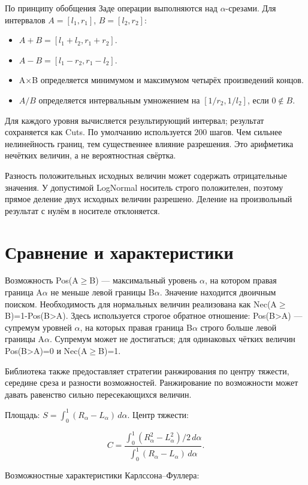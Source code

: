 \documentclass[fontsize=14pt,a4paper]{scrartcl}
\begin{document}
По принципу обобщения Заде операции выполняются над \(\alpha\)-срезами. Для интервалов $A=[l_1,r_1]$, $B=[l_2,r_2]$:

\begin{itemize}
\item $A+B=[l_1+l_2,r_1+r_2]$.
\item $A-B=[l_1-r_2,r_1-l_2]$.
\item A\(\times\)B определяется минимумом и максимумом четырёх произведений концов.
\item $A/B$ определяется интервальным умножением на $[1/r_2,1/l_2]$, если $0\notin B$.
\end{itemize}

Для каждого уровня вычисляется результирующий интервал; результат сохраняется как Cuts. По умолчанию используется 200 шагов. Чем сильнее нелинейность границ, тем существеннее влияние разрешения. Это арифметика нечётких величин, а не вероятностная свёртка.

Разность положительных исходных величин может содержать отрицательные значения. У допустимой LogNormal носитель строго положителен, поэтому прямое деление двух исходных величин разрешено. Деление на произвольный результат с нулём в носителе отклоняется.

\section{Сравнение и характеристики}

Возможность Pos(A\(\geq\)B) — максимальный уровень \(\alpha\), на котором правая граница A\(\alpha\) не меньше левой границы B\(\alpha\). Значение находится двоичным поиском. Необходимость для нормальных величин реализована как Nec(A\(\geq\)B)=1-Pos(B>A). Здесь используется строгое обратное отношение: Pos(B>A) — супремум уровней \(\alpha\), на которых правая граница B\(\alpha\) строго больше левой границы A\(\alpha\). Супремум может не достигаться; для одинаковых чётких величин Pos(B>A)=0 и Nec(A\(\geq\)B)=1.

Библиотека также предоставляет стратегии ранжирования по центру тяжести, середине среза и разности возможностей. Ранжирование по возможности может давать равенство сильно пересекающихся величин.

Площадь: $S=\int_0^1(R_\alpha-L_\alpha)\,d\alpha$. Центр тяжести:

\[
C=\frac{\int_0^1(R_\alpha^2-L_\alpha^2)/2\,d\alpha}{\int_0^1(R_\alpha-L_\alpha)\,d\alpha}.
\]

Возможностные характеристики Карлссона–Фуллера:
\end{document}
